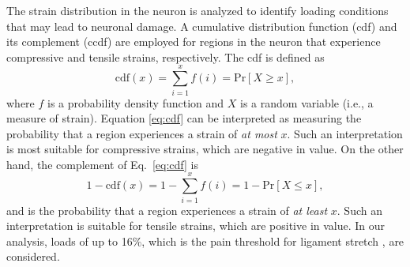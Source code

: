 \documentclass[10pt]{asme2ej}
\begin{document}
%
The strain distribution in the neuron is analyzed to identify loading conditions that may lead to neuronal damage. A cumulative distribution function (cdf) and its complement (ccdf) are employed for regions in the neuron that experience compressive and tensile strains, respectively. The cdf is defined as
%
\begin{equation}
\text{cdf}(x) = \sum_{i=1}^x f(i) = \text{Pr}[X \ge x],
\label{eq:cdf}
\end{equation}
%
where $f$ is a probability density function and $X$ is a random variable (i.e., a measure of strain). Equation \ref{eq:cdf} can be interpreted as measuring the probability that a region experiences a strain of \textit{at most} $x$. Such an interpretation is most suitable for compressive strains, which are negative in value. On the other hand, the complement of Eq.\ \eqref{eq:cdf} is
%
\begin{equation}
1 - \text{cdf}(x) = 1 - \sum_{i=1}^x f(i) = 1 - \text{Pr}[X \le x],
\label{eq:ccdf}
\end{equation}
%
and is the probability that a region experiences a strain of \textit{at least} $x$. Such an interpretation is suitable for tensile strains, which are positive in value. In our analysis, loads of up to 16$\%$, which is the pain threshold for ligament stretch \cite{Zhang:2016ga}, are considered. 

\end{document}
